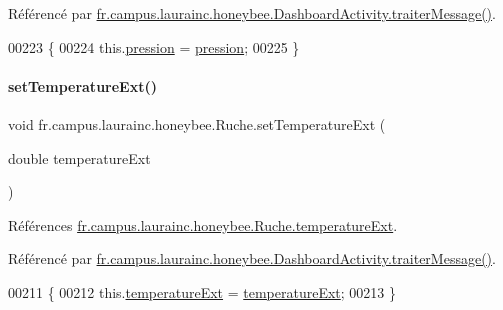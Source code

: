 Référencé par \hyperlink{classfr_1_1campus_1_1laurainc_1_1honeybee_1_1_dashboard_activity_a50d4c14e993ff1779ae5dce8cee11216}{fr.\+campus.\+laurainc.\+honeybee.\+Dashboard\+Activity.\+traiter\+Message()}.


\begin{DoxyCode}
00223                                              \{
00224         this.\hyperlink{classfr_1_1campus_1_1laurainc_1_1honeybee_1_1_ruche_a73ddf7686cdd056fe7dc4b249f6ada86}{pression} = \hyperlink{classfr_1_1campus_1_1laurainc_1_1honeybee_1_1_ruche_a73ddf7686cdd056fe7dc4b249f6ada86}{pression};
00225     \}
\end{DoxyCode}
\mbox{\label{classfr_1_1campus_1_1laurainc_1_1honeybee_1_1_ruche_a5f3aa639b62e7bebcec6532be378964d}} 
\paragraph{\texorpdfstring{set\+Temperature\+Ext()}{setTemperatureExt()}}
{\footnotesize\ttfamily void fr.\+campus.\+laurainc.\+honeybee.\+Ruche.\+set\+Temperature\+Ext (\begin{DoxyParamCaption}\item[{double}]{temperature\+Ext }\end{DoxyParamCaption})}



Références \hyperlink{classfr_1_1campus_1_1laurainc_1_1honeybee_1_1_ruche_aabdc13a8650aed77ee5497236e79174b}{fr.\+campus.\+laurainc.\+honeybee.\+Ruche.\+temperature\+Ext}.



Référencé par \hyperlink{classfr_1_1campus_1_1laurainc_1_1honeybee_1_1_dashboard_activity_a50d4c14e993ff1779ae5dce8cee11216}{fr.\+campus.\+laurainc.\+honeybee.\+Dashboard\+Activity.\+traiter\+Message()}.


\begin{DoxyCode}
00211                                                          \{
00212         this.\hyperlink{classfr_1_1campus_1_1laurainc_1_1honeybee_1_1_ruche_aabdc13a8650aed77ee5497236e79174b}{temperatureExt} = \hyperlink{classfr_1_1campus_1_1laurainc_1_1honeybee_1_1_ruche_aabdc13a8650aed77ee5497236e79174b}{temperatureExt};
00213     \}
\end{DoxyCode}
\mbox{\label{classfr_1_1campus_1_1laurainc_1_1honeybee_1_1_ruche_a4bed1041019b54d79beb46d36aae0adb}} 
